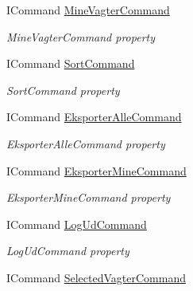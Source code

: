 \begin{DoxyCompactItemize}
I\+Command \hyperlink{class__1aarsproeve_1_1_view_model_1_1_vagtplan_view_model_abded4dcbd3699986defbf179b9d52001}{Mine\+Vagter\+Command}
\begin{DoxyCompactList}\small\item\em Mine\+Vagter\+Command property \end{DoxyCompactList}\item 
I\+Command \hyperlink{class__1aarsproeve_1_1_view_model_1_1_vagtplan_view_model_aa57320a9de71c8c0cd393e0fc2dd8eca}{Sort\+Command}
\begin{DoxyCompactList}\small\item\em Sort\+Command property \end{DoxyCompactList}\item 
I\+Command \hyperlink{class__1aarsproeve_1_1_view_model_1_1_vagtplan_view_model_aaacfd0f73f0fe5a3784fda8f7fb0c045}{Eksporter\+Alle\+Command}
\begin{DoxyCompactList}\small\item\em Eksporter\+Alle\+Command property \end{DoxyCompactList}\item 
I\+Command \hyperlink{class__1aarsproeve_1_1_view_model_1_1_vagtplan_view_model_a4606860561c41d7330663950515cf369}{Eksporter\+Mine\+Command}
\begin{DoxyCompactList}\small\item\em Eksporter\+Mine\+Command property \end{DoxyCompactList}\item 
I\+Command \hyperlink{class__1aarsproeve_1_1_view_model_1_1_vagtplan_view_model_aadc2e0233944328d65644e49b449f89b}{Log\+Ud\+Command}
\begin{DoxyCompactList}\small\item\em Log\+Ud\+Command property \end{DoxyCompactList}\item 
I\+Command \hyperlink{class__1aarsproeve_1_1_view_model_1_1_vagtplan_view_model_aa46683f207146cac5e2d09555727d8f9}{Selected\+Vagter\+Command}

\end{DoxyCompactItemize}
